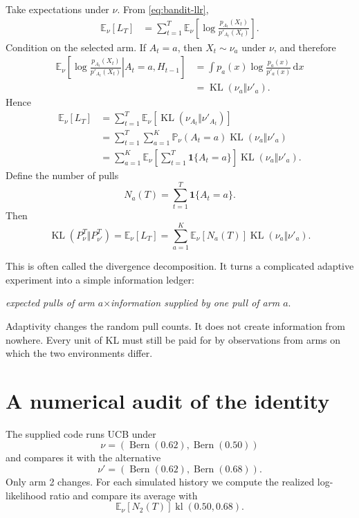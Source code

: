 \documentclass[en,nofont,11pt]{elegantbook}
\newcommand{\E}{\mathbb{E}}
\newcommand{\Pbb}{\mathbb{P}}
\newcommand{\one}{\mathbf{1}}
\newcommand{\KL}{\operatorname{KL}}
\newcommand{\kl}{\operatorname{kl}}
\newcommand{\Ber}{\operatorname{Bern}}
\newcommand{\dd}{\mathrm{d}}
\begin{document}
Take expectations under $\nu$. From \eqref{eq:bandit-llr},
\begin{align*}
\E_\nu[L_T]
&=
\sum_{t=1}^{T}
\E_\nu\left[
\log\frac{p_{A_t}(X_t)}{p'_{A_t}(X_t)}
\right].
\end{align*}
Condition on the selected arm. If $A_t=a$, then $X_t\sim\nu_a$ under $\nu$, and therefore
\begin{align*}
\E_\nu\left[
\left.
\log\frac{p_{A_t}(X_t)}{p'_{A_t}(X_t)}
\right|A_t=a, H_{t-1}
\right]
&=
\int p_a(x)\log\frac{p_a(x)}{p'_a(x)}\,\dd x\\
&=
\KL(\nu_a\Vert\nu'_a).
\end{align*}
Hence
\begin{align*}
\E_\nu[L_T]
&=
\sum_{t=1}^{T}
\E_\nu\left[\KL(\nu_{A_t}\Vert\nu'_{A_t})\right]\\
&=
\sum_{t=1}^{T}
\sum_{a=1}^{K}
\Pbb_\nu(A_t=a)\KL(\nu_a\Vert\nu'_a)\\
&=
\sum_{a=1}^{K}
\E_\nu\left[
\sum_{t=1}^{T}\one\{A_t=a\}
\right]
\KL(\nu_a\Vert\nu'_a).
\end{align*}
Define the number of pulls
\[
N_a(T)=\sum_{t=1}^{T}\one\{A_t=a\}.
\]
Then
\begin{equation}
\boxed{
\KL(P_\nu^T\Vert P_{\nu'}^T)
=
\E_\nu[L_T]
=
\sum_{a=1}^{K}
\E_\nu[N_a(T)]\KL(\nu_a\Vert\nu'_a).
}
\label{eq:divergence-decomposition}
\end{equation}

This is often called the divergence decomposition. It turns a complicated adaptive experiment into a simple information ledger:

\begin{center}
\emph{expected pulls of arm $a$}\quad$\times$\quad\emph{information supplied by one pull of arm $a$}.
\end{center}

\begin{keyidea}
Adaptivity changes the random pull counts. It does not create information from nowhere. Every unit of KL must still be paid for by observations from arms on which the two environments differ.
\end{keyidea}

\section{A numerical audit of the identity}

The supplied code runs UCB under
\[
\nu=(\Ber(0.62),\Ber(0.50))
\]
and compares it with the alternative
\[
\nu'=(\Ber(0.62),\Ber(0.68)).
\]
Only arm 2 changes. For each simulated history we compute the realized log-likelihood ratio and compare its average with
\[
\E_\nu[N_2(T)]\kl(0.50,0.68).
\]
\end{document}
